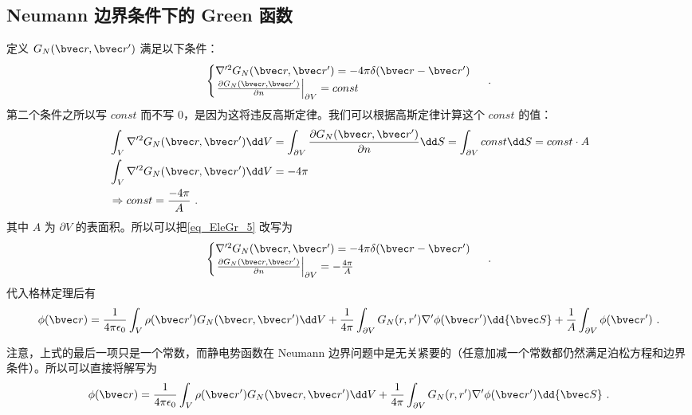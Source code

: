 \subsection{Neumann 边界条件下的 Green 函数}
定义 $G_N(\bvec r,\bvec r')$ 满足以下条件：
\begin{equation}\label{eq_EleGr_5}
\begin{cases}
\nabla'^2G_N(\bvec r,\bvec r')=-4\pi\delta(\bvec r-\bvec r')\\
\left.\frac{\partial G_N(\bvec r,\bvec r')}{\partial n}\right|_{\partial V}=const
\end{cases}~.
\end{equation}
第二个条件之所以写 $const$ 而不写 $0$，是因为这将违反高斯定律。我们可以根据高斯定律计算这个 $const$ 的值：
\begin{equation}
\begin{aligned}
&\int_V \nabla'^2 G_N(\bvec r,\bvec r')\dd V=\int_{\partial V}\frac{\partial G_N(\bvec r,\bvec r')}{\partial n}\dd S=\int_{\partial V}const \dd S=const\cdot A\\
&\int_V \nabla'^2 G_N(\bvec r,\bvec r')\dd V=-4\pi\\
&\Rightarrow const=\frac{-4\pi}{A}~.
\end{aligned}
\end{equation}
其中 $A$ 为 $\partial V$ 的表面积。所以可以把\autoref{eq_EleGr_5} 改写为
\begin{equation}
\begin{cases}
\nabla'^2G_N(\bvec r,\bvec r')=-4\pi\delta(\bvec r-\bvec r')\\
\left.\frac{\partial G_N(\bvec r,\bvec r')}{\partial n}\right|_{\partial V}=-\frac{4\pi}{A}
\end{cases}~.
\end{equation}
代入格林定理后有
\begin{equation}
\phi(\bvec r)=\frac{1}{4\pi\epsilon_0}\int_V \rho(\bvec r')G_N(\bvec r,\bvec r')\dd V+\frac{1}{4\pi}\int_{\partial V} G_N(r,r')\nabla'\phi(\bvec r')\dd {\bvec S}+\frac{1}{A}\int_{\partial V}\phi(\bvec r')~.
\end{equation}

注意，上式的最后一项只是一个常数，而静电势函数在 Neumann 边界问题中是无关紧要的（任意加减一个常数都仍然满足泊松方程和边界条件）。所以可以直接将解写为
\begin{equation}\label{eq_EleGr_7}
\phi(\bvec r)=\frac{1}{4\pi\epsilon_0}\int_V \rho(\bvec r')G_N(\bvec r,\bvec r')\dd V+\frac{1}{4\pi}\int_{\partial V} G_N(r,r')\nabla'\phi(\bvec r')\dd {\bvec S}~.
\end{equation}

